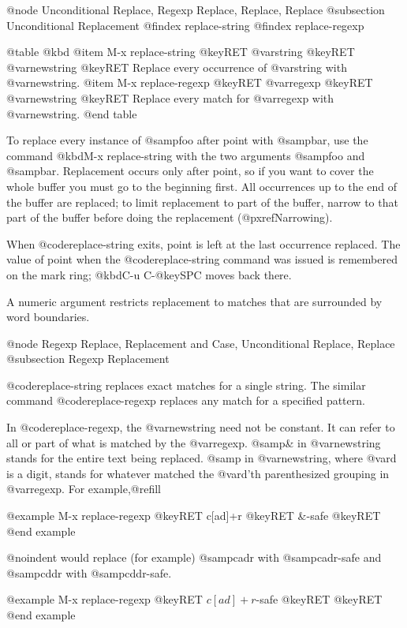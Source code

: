 {{{{{{{{{{{{{{{{{{@node Unconditional Replace, Regexp Replace, Replace, Replace
@subsection Unconditional Replacement
@findex replace-string
@findex replace-regexp

@table @kbd
@item M-x replace-string @key{RET} @var{string} @key{RET} @var{newstring} @key{RET}
Replace every occurrence of @var{string} with @var{newstring}.
@item M-x replace-regexp @key{RET} @var{regexp} @key{RET} @var{newstring} @key{RET}
Replace every match for @var{regexp} with @var{newstring}.
@end table

  To replace every instance of @samp{foo} after point with @samp{bar}, use
the command @kbd{M-x replace-string} with the two arguments @samp{foo} and
@samp{bar}.  Replacement occurs only after point, so if you want to cover
the whole buffer you must go to the beginning first.  All occurrences up to
the end of the buffer are replaced; to limit replacement to part of the
buffer, narrow to that part of the buffer before doing the replacement
(@pxref{Narrowing}).

  When @code{replace-string} exits, point is left at the last occurrence
replaced.  The value of point when the @code{replace-string} command was
issued is remembered on the mark ring; @kbd{C-u C-@key{SPC}} moves back
there.

  A numeric argument restricts replacement to matches that are surrounded
by word boundaries.

@node Regexp Replace, Replacement and Case, Unconditional Replace, Replace
@subsection Regexp Replacement

  @code{replace-string} replaces exact matches for a single string.  The
similar command @code{replace-regexp} replaces any match for a specified
pattern.

  In @code{replace-regexp}, the @var{newstring} need not be constant.  It
can refer to all or part of what is matched by the @var{regexp}.  @samp{\&}
in @var{newstring} stands for the entire text being replaced.
@samp{} in @var{newstring}, where @var{d} is a digit, stands for
whatever matched the @var{d}'th parenthesized grouping in @var{regexp}.
For example,@refill

@example
M-x replace-regexp @key{RET} c[ad]+r @key{RET} \&-safe @key{RET}
@end example

@noindent
would replace (for example) @samp{cadr} with @samp{cadr-safe} and @samp{cddr}
with @samp{cddr-safe}.

@example
M-x replace-regexp @key{RET} \(c[ad]+r\)-safe @key{RET} \1 @key{RET}
@end example

}}}}}}}}}}}}}}}}}}
